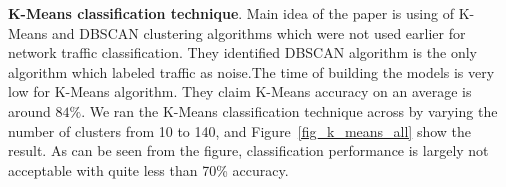 \documentclass[conference]{IEEEtran}
\begin{document}
\textbf{K-Means classification technique}\cite{Erman:2006:TCU:1162678.1162679}. 
Main idea of the paper\cite{Erman:2006:TCU:1162678.1162679} is using of K-Means and DBSCAN clustering algorithms which were not used earlier for network traffic classification.  They identified DBSCAN algorithm is the only algorithm which labeled traffic as noise.The time of building the models is very low for K-Means algorithm. They claim K-Means accuracy on an average is around $84\%$.
We ran the K-Means classification technique across by varying the number of clusters from 10 to 140, and Figure~\ref{fig_k_means_all} show the result.
As can be seen from the figure, classification performance is largely not acceptable with quite less than 70\% accuracy.
\end{document}
